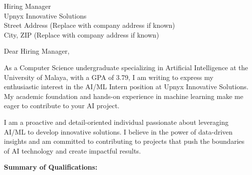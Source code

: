 \documentclass[10.5pt]{letter}
\date{\today}
\begin{document}
\begin{letter}{Hiring Manager\\Upnyx Innovative Solutions\\Street Address (Replace with company address if known)\\City, ZIP (Replace with company address if known)}

\opening{Dear Hiring Manager,}

As a Computer Science undergraduate specializing in Artificial Intelligence at the University of Malaya, with a GPA of 3.79, I am writing to express my enthusiastic interest in the AI/ML Intern position at Upnyx Innovative Solutions. My academic foundation and hands-on experience in machine learning make me eager to contribute to your AI project.

I am a proactive and detail-oriented individual passionate about leveraging AI/ML to develop innovative solutions. I believe in the power of data-driven insights and am committed to contributing to projects that push the boundaries of AI technology and create impactful results.

\vspace{0.3cm}
\textbf{Summary of Qualifications:}
\vspace{0.2cm}


\end{letter}
\end{document}
